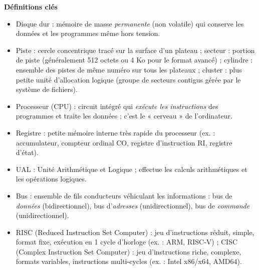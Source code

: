 \documentclass[11pt]{article}
\newcommand{\cle}[1]{{\popxbold\color{popdark}#1}}
\begin{document}
\begin{aretenir}
\textbf{Définitions clés}
\begin{itemize}
  \item \cle{Disque dur} : mémoire de masse \emph{permanente} (non volatile) qui conserve les données et les programmes même hors tension.
  \item \cle{Piste} : cercle concentrique tracé sur la surface d'un plateau ; \cle{secteur} : portion de piste (généralement 512 octets ou 4 Ko pour le format avancé) ; \cle{cylindre} : ensemble des pistes de même numéro sur tous les plateaux ; \cle{cluster} : plus petite unité d'allocation logique (groupe de secteurs contigus gérée par le système de fichiers).
  \item \cle{Processeur} (CPU) : circuit intégré qui \emph{exécute les instructions} des programmes et traite les données ; c'est le « cerveau » de l'ordinateur.
  \item \cle{Registre} : petite mémoire interne très rapide du processeur (ex. : accumulateur, compteur ordinal CO, registre d'instruction RI, registre d'état).
  \item \cle{UAL} : Unité Arithmétique et Logique ; effectue les calculs arithmétiques et les opérations logiques.
  \item \cle{Bus} : ensemble de fils conducteurs véhiculant les informations : bus de \emph{données} (bidirectionnel), bus d'\emph{adresses} (unidirectionnel), bus de \emph{commande} (unidirectionnel).
  \item \cle{RISC} (Reduced Instruction Set Computer) : jeu d'instructions réduit, simple, format fixe, exécution en 1 cycle d'horloge (ex. : ARM, RISC-V) ; \cle{CISC} (Complex Instruction Set Computer) : jeu d'instructions riche, complexe, formats variables, instructions multi-cycles (ex. : Intel x86/x64, AMD64).
\end{itemize}


\end{aretenir}
\end{document}
